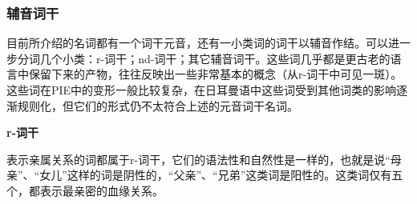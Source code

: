 \subsubsection{辅音词干}\label{ux8f85ux97f3ux8bcdux5e72}

目前所介绍的名词都有一个词干元音，还有一小类词的词干以辅音作结。可以进一步分词几个小类：r-词干；nd-词干；其它辅音词干。这些词几乎都是更古老的语言中保留下来的产物，往往反映出一些非常基本的概念（从r-词干中可见一斑）。这些词在PIE中的变形一般比较复杂，在日耳曼语中这些词受到其他词类的影响逐渐规则化，但它们的形式仍不太符合上述的元音词干名词。

\textbf{r-词干}

表示亲属关系的词都属于r-词干，它们的语法性和自然性是一样的，也就是说``母亲''、``女儿''这样的词是阴性的，``父亲''、``兄弟''这类词是阳性的。这类词仅有五个，都表示最亲密的血缘关系。

